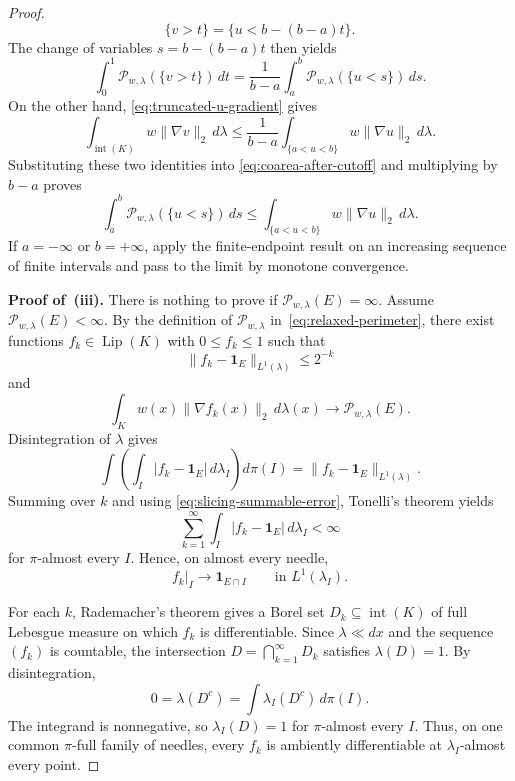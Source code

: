 \documentclass[11pt]{article}
\theoremstyle{definition}
\theoremstyle{remark}
\begin{document}
\begin{proof}
\[
 \{v>t\}
 =
 \{u<b-(b-a)t\}.
\]
The change of variables $s=b-(b-a)t$ then yields
\[
 \int_0^1\mathcal P_{w,\lambda}(\{v>t\})\,dt
 =
 \frac1{b-a}
 \int_a^b\mathcal P_{w,\lambda}(\{u<s\})\,ds.
\]
On the other hand, \eqref{eq:truncated-u-gradient} gives
\[
 \int_{\operatorname{int}(K)} w\|\nabla v\|_2\,d\lambda
 \le
 \frac1{b-a}
 \int_{\{a<u<b\}}
 w\|\nabla u\|_2\,d\lambda.
\]
Substituting these two identities into
\eqref{eq:coarea-after-cutoff} and multiplying by \(b-a\) proves
\[
 \int_a^b\mathcal P_{w,\lambda}(\{u<s\})\,ds
 \le
 \int_{\{a<u<b\}}
 w\|\nabla u\|_2\,d\lambda.
\]
If \(a=-\infty\) or \(b=+\infty\), apply the finite-endpoint result on an
increasing sequence of finite intervals and pass to the limit by
monotone convergence.

\textbf{Proof of~\textup{(iii)}.}
There is nothing to prove if \(\mathcal P_{w,\lambda}(E)=\infty\).  Assume
\(\mathcal P_{w,\lambda}(E)<\infty\).  By the definition of $\mathcal P_{w,\lambda}$ in~\eqref{eq:relaxed-perimeter}, there exist functions $f_k\in\operatorname{Lip}(K)$ with $0\leq f_k\leq 1$ such that
\begin{equation}\label{eq:slicing-summable-error}
 \|f_k-\mathbf1_E\|_{L^1(\lambda)}\le2^{-k}
\end{equation}
and
\begin{equation}\label{eq:slicing-recovery}
 \int_Kw(x)\|\nabla f_k(x)\|_2\,d\lambda(x)
 \longrightarrow
 \mathcal P_{w,\lambda}(E).
\end{equation}
Disintegration of $\lambda$ gives
\[
 \int
 \left(
  \int_I|f_k-\mathbf1_E|\,d\lambda_I
 \right)d\pi(I)
 =
 \|f_k-\mathbf1_E\|_{L^1(\lambda)}.
\]
Summing over \(k\) and using
\eqref{eq:slicing-summable-error}, Tonelli's theorem yields
\[
 \sum_{k=1}^\infty
 \int_I|f_k-\mathbf1_E|\,d\lambda_I
 <\infty
\]
for \(\pi\)-almost every \(I\).  Hence, on almost every needle,
\begin{equation}\label{eq:fiberwise-convergence}
 f_k|_I
 \longrightarrow
 \mathbf1_{E\cap I}
 \qquad\text{in }L^1(\lambda_I).
\end{equation}

For each \(k\), Rademacher's theorem gives a Borel set
\(D_k\subseteq\operatorname{int}(K)\) of full Lebesgue measure on which \(f_k\) is
differentiable.  Since $\lambda\ll dx$ and the sequence \((f_k)\) is countable,
the intersection $D=\bigcap_{k=1}^\infty D_k$ satisfies \(\lambda(D)=1\).  By disintegration,
\[
 0=\lambda(D^c)
   =\int\lambda_I(D^c)\,d\pi(I).
\]
The integrand is nonnegative, so $\lambda_I(D)=1$
for \(\pi\)-almost every \(I\).  Thus, on one common
\(\pi\)-full family of needles, every \(f_k\) is ambiently
differentiable at \(\lambda_I\)-almost every point.


\end{proof}
\end{document}
